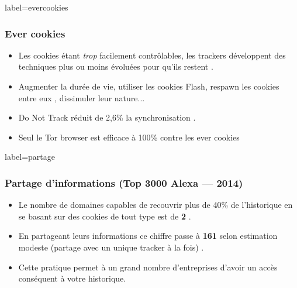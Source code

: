 \documentclass{beamer}
\begin{document}
        \begin{frame}{label=evercookies}
            \frametitle{Ever cookies}
            \begin{center}
                \begin{itemize}
                    \item Les cookies étant \textit{trop} facilement contrôlables, les trackers développent des techniques plus ou moins évoluées pour qu'ils restent \cite{web}.
                    \item Augmenter la durée de vie, utiliser les cookies Flash, respawn les cookies entre eux \cite{web}, dissimuler leur nature...
                    \item Do Not Track réduit de 2,6\% la synchronisation \cite{web}.
                    \item Seul le Tor browser est efficace à 100\% contre les ever cookies
                \end{itemize}
            \end{center}
        \end{frame}
        \begin{frame}{label=partage}
            \frametitle{Partage d'informations (Top 3000 Alexa --- 2014)}
            \begin{center}
                \begin{itemize}
                    \item Le nombre de domaines capables de recouvrir plus de 40\% de l'historique en se basant sur des cookies de tout type est de \textbf{2} \cite{web}.
                    \item En partageant leurs informations ce chiffre passe à \textbf{161} selon estimation modeste (partage avec un unique tracker à la fois) \cite{web}.
                    \item Cette pratique permet à un grand nombre d'entreprises d'avoir un accès conséquent à votre historique.
                \end{itemize}
            \end{center}
        \end{frame}
\end{document}

